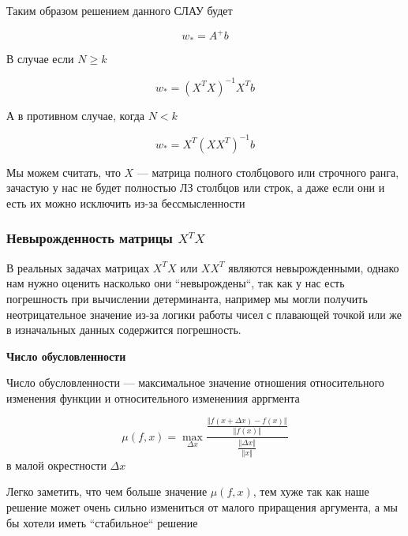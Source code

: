 \documentclass{article}
\begin{document}
    Таким образом решением данного СЛАУ будет

    \begin{equation}
        w_{*} = A^{+}b
    \end{equation}

    В случае если $N \geq k$
    
    \begin{equation}
        w_{*} = (X^{T} X)^{-1} X^{T} b
    \end{equation}

    А в противном случае, когда $N < k$

    \begin{equation}
        w_{*} = X^{T} (X X^{T})^{-1} b
    \end{equation}

    Мы можем считать, что $X$ --- матрица полного столбцового или строчного ранга, зачастую у нас не будет полностью ЛЗ столбцов или строк, а
    даже если они и есть их можно исключить из-за бессмысленности

    \subsubsection{Невырожденность матрицы $X^{T} X$}

    В реальных задачах матрицах $X^{T} X$ или $X X^{T}$ являются невырожденными, однако нам нужно оценить насколько они
    ``невырождены``, так как у нас есть погрешность при вычислении детерминанта, например мы могли получить неотрицательное значение
    из-за логики работы чисел с плавающей точкой или же в изначальных данных содержится погрешность.

    \quad

    \textbf{Число обусловленности}

    \quad


    Число обусловленности --- максимальное значение отношения относительного изменения функции и относительного изменениия арргмента

    \begin{equation}
        \mu(f, x) = \max_{\Delta x} \frac{ \frac{\Vert f(x + \Delta x) - f(x) \Vert}{\Vert f(x) \Vert}  }{ \frac{\Vert \Delta x \Vert}{\Vert x \Vert } }
    \end{equation}
    в малой окрестности $\Delta x$

    Легко заметить, что чем больше значение $\mu(f, x)$, тем хуже так как наше решение может очень сильно измениться от малого приращения аргумента, а мы бы хотели
    иметь ``стабильное`` решение
\end{document}
